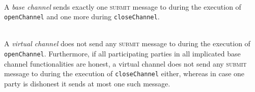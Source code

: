 \begin{definition} \ \\
  A {\em base channel} sends exactly one \textsc{submit} message to \ledger{}
  during the execution of \texttt{openChannel} and one more during
  \texttt{closeChannel}.
\end{definition}

\begin{definition} \ \\
  A {\em virtual channel} does not send any \textsc{submit} message to \ledger{}
  during the execution of \texttt{openChannel}. Furthermore, if all
  participating parties in all implicated base channel functionalities are
  honest, a virtual channel does not send any \textsc{submit} message to
  \ledger{} during the execution of \texttt{closeChannel} either, whereas in
  case one party is dishonest it sends at most one such message.
\end{definition}
